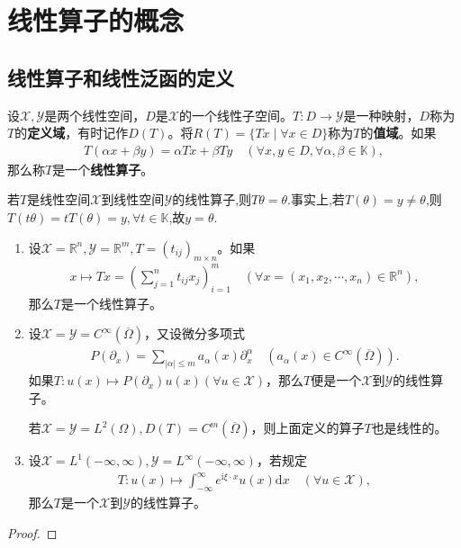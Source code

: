 \documentclass[../../main.tex]{subfiles}%
\begin{document}
\section{线性算子的概念}

\subsection{线性算子和线性泛函的定义}

\begin{definition}[线性算子]
设$\mathscr{X},\mathscr{Y}$是两个线性空间，$D$是$\mathscr{X}$的一个线性子空间。$T:D\to\mathscr{Y}$是一种映射，$D$称为$T$的\textbf{定义域}，有时记作$D(T)$。将$R(T)=\{Tx\mid \forall x\in D\}$称为$T$的\textbf{值域}。如果
\begin{align*}
T(\alpha x+\beta y)=\alpha Tx+\beta Ty\quad (\forall x,y\in D,\forall \alpha,\beta\in\mathbb{K}),
\end{align*}
那么称$T$是一个\textbf{线性算子}。
\end{definition}
\begin{remark}
若$T$是线性空间$\mathscr{X}$到线性空间$\mathscr{Y}$的线性算子,则$T\theta=\theta$.事实上,若$T(\theta)=y\neq \theta$,则$T(t\theta)=tT(\theta)=y,\forall t\in \mathbb{K}$,故$y=\theta$.
\end{remark}

\begin{proposition}
\begin{enumerate}[(1)]
\item 设$\mathscr{X}=\mathbb{R}^n,\mathscr{Y}=\mathbb{R}^m,T=(t_{ij})_{m\times n}$。如果
\begin{align*}
x\mapsto Tx=\left( \sum\limits_{j=1}^n t_{ij}x_j \right)_{i=1}^m\quad (\forall x=(x_1,x_2,\cdots,x_n)\in\mathbb{R}^n),
\end{align*}
那么$T$是一个线性算子。

\item 设$\mathscr{X}=\mathscr{Y}=C^\infty(\overline{\Omega})$，又设微分多项式
\begin{align*}
P(\partial_x)=\sum\limits_{|\alpha|\leqslant m} a_\alpha(x)\partial_x^\alpha\quad (a_\alpha(x)\in C^\infty(\overline{\Omega})).
\end{align*}
如果$T:u(x)\mapsto P(\partial_x)u(x)(\forall u\in\mathscr{X})$，那么$T$便是一个$\mathscr{X}$到$\mathscr{Y}$的线性算子。

若$\mathscr{X}=\mathscr{Y}=L^2(\Omega),D(T)=C^m(\overline{\Omega})$，则上面定义的算子$T$也是线性的。

\item 设$\mathscr{X}=L^1(-\infty,\infty),\mathscr{Y}=L^\infty(-\infty,\infty)$，若规定
\begin{align*}
T:u(x)\mapsto \int_{-\infty}^\infty e^{\mathrm{i}\xi\cdot x}u(x)\mathrm{d}x\quad (\forall u\in\mathscr{X}),
\end{align*}
那么$T$是一个$\mathscr{X}$到$\mathscr{Y}$的线性算子。
\end{enumerate}
\end{proposition}
\begin{proof}


\end{proof}
\end{document}
